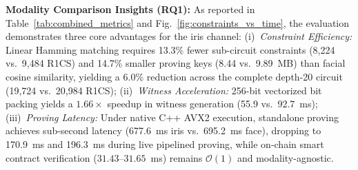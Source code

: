 \documentclass[10pt,letterpaper,journal]{IEEEtran}
\begin{document}
\begin{table}[t]
\centering
\caption{Biometric Channel Circuit Artifacts, Acceleration Metrics, and Latencies}
\label{tab:combined_metrics}
\setlength{\tabcolsep}{4.5pt}
\renewcommand{\arraystretch}{1.22}
\vspace{2pt}\par{}
\end{table}

\textbf{Modality Comparison Insights (RQ1):}
As reported in Table~\ref{tab:combined_metrics} and Fig.~\ref{fig:constraints_vs_time}, the evaluation demonstrates three core advantages for the iris channel:
(i)~\emph{Constraint Efficiency:} Linear Hamming matching requires 13.3\% fewer sub-circuit constraints (8,224 vs.\ 9,484 R1CS) and 14.7\% smaller proving keys (8.44 vs.\ 9.89~MB) than facial cosine similarity, yielding a 6.0\% reduction across the complete depth-20 circuit (19,724 vs.\ 20,984 R1CS);
(ii)~\emph{Witness Acceleration:} 256-bit vectorized bit packing yields a $1.66\times$ speedup in witness generation (55.9 vs.\ 92.7~ms);
(iii)~\emph{Proving Latency:} Under native C++ AVX2 execution, standalone proving achieves sub-second latency (677.6~ms iris vs.\ 695.2~ms face), dropping to 170.9~ms and 196.3~ms during live pipelined proving, while on-chain smart contract verification ($31.43$--$31.65$~ms) remains $\mathcal{O}(1)$ and modality-agnostic.
\end{document}
